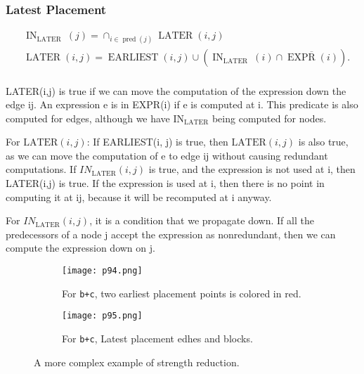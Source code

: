 \subsubsection{Latest	Placement}


$$
\begin{aligned}
&\operatorname{IN}_{\text {LATER }}(j)=\cap_{i \in \operatorname{pred}(j)} \operatorname{LATER}(i, j) \\
&\operatorname{LATER}(i, j)=\operatorname{EARLIEST}(i, j) \cup\left(\operatorname{IN}_{\text {LATER }}(i) \cap \overline{\operatorname{EXPR}(i)}\right). \\
&
\end{aligned}
$$


LATER(i,j)	is	true	if	we	can	move	the	computation	of	the	
expression	down	the	edge	ij.	 An	expression	e	is	in	
EXPR(i)	if	e	is	computed	at	i.	This	predicate	is	also
 computed	for	edges,	although	we	
have	IN$_\mathrm{LATER}$	being	computed	for	nodes.	




For \( \mathrm{LATER}(i,j) \): If	EARLIEST(i,	j)	is	true,	
then	\( \mathrm{LATER}(i,j) \)	is	also	true,	as	we	
can	move	the	computation	of	e	to	edge	ij	without	
causing	redundant	computations. 	If	\( IN_{\mathrm{LATER}}(i,j) \)	is	true,	
and	the	expression	is	not	used	at	i,	
then	LATER(i,j)	is	true.	If	the	expression	is	used	at	i,	then	there	is	no	point	in	
computing	it	at	ij,	because	it	will	be	recomputed	at	i
anyway.	


For \( IN_{\mathrm{LATER}}(i,j) \), it is	a	condition	that	
we	propagate	down.	If	all	the	predecessors	of	a	
node	j	accept	the	
expression	as	nonredundant,	then	we	can	
compute	the	expression	
down	on	j.	

\begin{figure}[H]
    \centering
    \begin{subfigure}{0.3\textwidth}
    \centering
        \texttt{[image: p94.png]}
        \caption{For \texttt{b+c}, 	two	
        earliest	placement	
        points is colored in red.}
        \label{fig:p94}
    \end{subfigure}
    \begin{subfigure}{0.4\textwidth}
    \centering
        \texttt{[image: p95.png]}
        \caption{For \texttt{b+c}, Latest placement edhes and blocks.}
        \label{fig:p95}
    \end{subfigure}
    
    \caption{A more complex example of strength reduction.}
       \label{fig:p74-76}
\end{figure}



